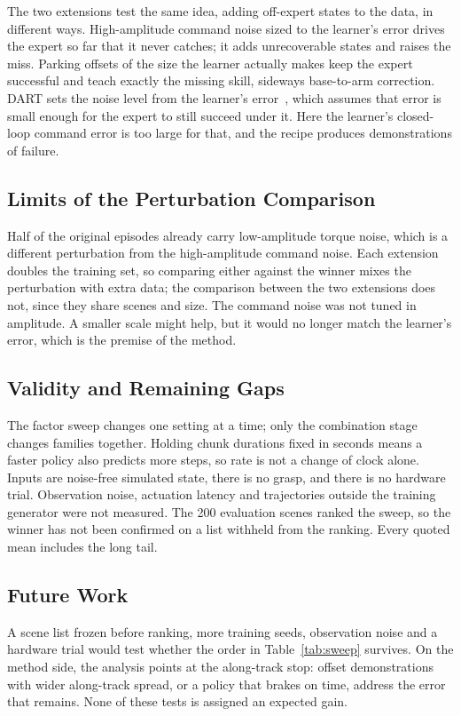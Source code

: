 \documentclass[conference]{IEEEtran}
\begin{document}
The two extensions test the same idea, adding off-expert states to the data, in different ways. High-amplitude command noise sized to the learner's error drives the expert so far that it never catches; it adds unrecoverable states and raises the miss. Parking offsets of the size the learner actually makes keep the expert successful and teach exactly the missing skill, sideways base-to-arm correction. DART sets the noise level from the learner's error~\cite{laskey2017}, which assumes that error is small enough for the expert to still succeed under it. Here the learner's closed-loop command error is too large for that, and the recipe produces demonstrations of failure.

\subsection{Limits of the Perturbation Comparison}
Half of the original episodes already carry low-amplitude torque noise, which is a different perturbation from the high-amplitude command noise. Each extension doubles the training set, so comparing either against the winner mixes the perturbation with extra data; the comparison between the two extensions does not, since they share scenes and size. The command noise was not tuned in amplitude. A smaller scale might help, but it would no longer match the learner's error, which is the premise of the method.

\subsection{Validity and Remaining Gaps}
The factor sweep changes one setting at a time; only the combination stage changes families together. Holding chunk durations fixed in seconds means a faster policy also predicts more steps, so rate is not a change of clock alone. Inputs are noise-free simulated state, there is no grasp, and there is no hardware trial. Observation noise, actuation latency and trajectories outside the training generator were not measured. The 200 evaluation scenes ranked the sweep, so the winner has not been confirmed on a list withheld from the ranking. Every quoted mean includes the long tail.

\subsection{Future Work}
A scene list frozen before ranking, more training seeds, observation noise and a hardware trial would test whether the order in Table~\ref{tab:sweep} survives. On the method side, the analysis points at the along-track stop: offset demonstrations with wider along-track spread, or a policy that brakes on time, address the error that remains. None of these tests is assigned an expected gain.
\end{document}
